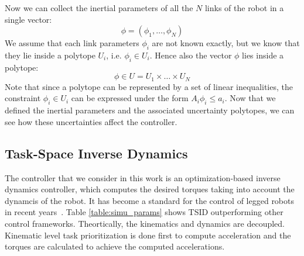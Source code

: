 Now we can collect the inertial parameters of all the $N$ links of the robot in a single vector:
\begin{equation*}
\phi = (\phi_1, \dots, \phi_N)
\end{equation*}
We assume that each link parameters $\phi_i$ are not known exactly, but we know that they lie inside a polytope $U_i$, i.e. $\phi_i \in U_i$.
Hence also the vector $\phi$ lies inside a polytope:
$$
\phi \in U = U_1 \times \dots \times U_N
$$
Note that since a polytope can be represented by a set of linear inequalities, the constraint $\phi_i \in U_i$ can be expressed under the form $A_i \phi_i \le a_i$. Now that we defined the inertial parameters and the associated uncertainty polytopes, we can see how these uncertainties affect the controller.
\subsection{Task-Space Inverse Dynamics}
The controller that we consider in this work is an optimization-based inverse dynamics controller, which computes the desired torques taking into account the dynamcis of the robot. It has become a standard for the control of legged robots in recent years~\cite{DelPrete2014c,Herzog2016,Sentis2004,Saab2011}. Table \ref{table:simu_params} shows TSID outperforming other control frameworks.
Theortically, the kinematics and dynamics are decoupled. Kinematic level task prioritization is done first to compute acceleration and the torques are calculated to achieve the computed accelerations. 
